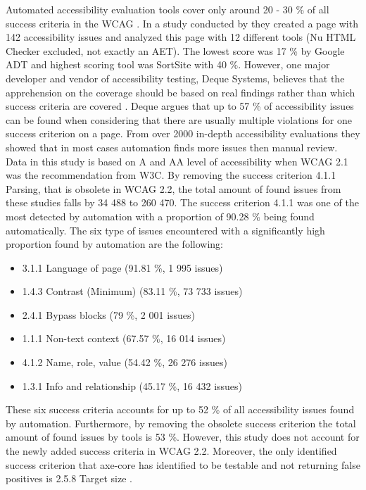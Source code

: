 Automated accessibility evaluation tools cover only around 20 - 30 \% of all success criteria in the WCAG \citep{govukaccessibilityresults, webaimmillions, dequecoverage}. In a study conducted by \cite{govukaccessibilityresults} they created a page with 142 accessibility issues and analyzed this page with 12 different tools (Nu HTML Checker excluded, not exactly an AET). The lowest score was 17 \% by Google ADT and highest scoring tool was SortSite with 40 \%. However, one major developer and vendor of accessibility testing, Deque Systems, believes that the apprehension on the coverage should be based on real findings rather than which success criteria are covered \citep{dequecoverage}. Deque argues that up to 57 \% of accessibility issues can be found when considering that there are usually multiple violations for one success criterion on a page. From over 2000 in-depth accessibility evaluations they showed that in most cases automation finds more issues then manual review. Data in this study is based on A and AA level of accessibility when WCAG 2.1 was the recommendation from W3C. By removing the success criterion 4.1.1 Parsing, that is obsolete in WCAG 2.2, the total amount of found issues from these studies falls by 34 488 to 260 470. The success criterion 4.1.1 was one of the most detected by automation with a proportion of 90.28 \% being found automatically. The six type of issues encountered with a significantly high proportion found by automation are the following: 

\begin{itemize}
  \item 3.1.1 Language of page (91.81 \%, 1 995 issues)
  \item 1.4.3 Contrast (Minimum) (83.11 \%, 73 733 issues)
  \item 2.4.1 Bypass blocks (79 \%, 2 001 issues)
  \item 1.1.1 Non-text context (67.57 \%, 16 014 issues)
  \item 4.1.2 Name, role, value (54.42 \%, 26 276 issues)
  \item 1.3.1 Info and relationship (45.17 \%, 16 432 issues)
\end{itemize}

These six success criteria accounts for up to 52 \% of all accessibility issues found by automation. Furthermore, by removing the obsolete success criterion the total amount of found issues by tools is 53 \%. However, this study does not account for the newly added success criteria in WCAG 2.2. Moreover, the only identified success criterion that axe-core has identified to be testable and not returning false positives is 2.5.8 Target size \citep{dequeaxe4_5}.

